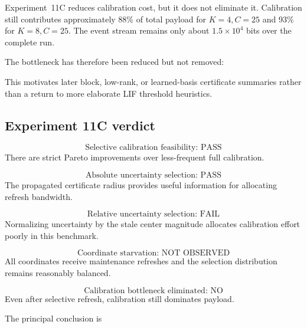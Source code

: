 Experiment~11C reduces calibration cost, but it does not eliminate it. Calibration still contributes approximately 88\% of total payload for $K=4,C=25$ and 93\% for $K=8,C=25$. The event stream remains only about $1.5\times10^4$ bits over the complete run.

The bottleneck has therefore been reduced but not removed:
\begin{center}
\end{center}
This motivates later block, low-rank, or learned-basis certificate summaries rather than a return to more elaborate LIF threshold heuristics.

\subsection{Experiment 11C verdict}

\begin{equation}
  \boxed{\text{Selective calibration feasibility: PASS}}
\end{equation}
There are strict Pareto improvements over less-frequent full calibration.

\begin{equation}
  \boxed{\text{Absolute uncertainty selection: PASS}}
\end{equation}
The propagated certificate radius provides useful information for allocating refresh bandwidth.

\begin{equation}
  \boxed{\text{Relative uncertainty selection: FAIL}}
\end{equation}
Normalizing uncertainty by the stale center magnitude allocates calibration effort poorly in this benchmark.

\begin{equation}
  \boxed{\text{Coordinate starvation: NOT OBSERVED}}
\end{equation}
All coordinates receive maintenance refreshes and the selection distribution remains reasonably balanced.

\begin{equation}
  \boxed{\text{Calibration bottleneck eliminated: NO}}
\end{equation}
Even after selective refresh, calibration still dominates payload.

The principal conclusion is
\begin{center}
\end{center}
